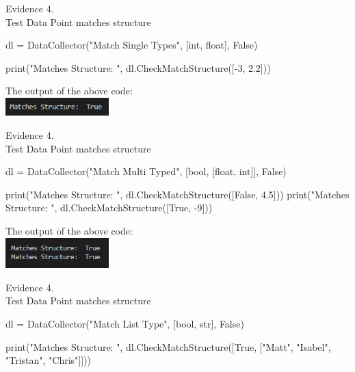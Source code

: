 \begin{center}
    {\large Evidence 4.\rn } \\ 
    \vspace{0.3cm}
    Test Data Point matches structure \\

    \begin{pythoncode}
dl = DataCollector("Match Single Types", [int, float], False)

print("Matches Structure: ", dl.CheckMatchStructure([-3, 2.2]))
    \end{pythoncode}

    The output of the above code: \\
    \includegraphics[width=4cm]{Images/Testing/T4.3.1.PNG} \\
    \vspace{1cm}

    {\large Evidence 4.\rn } \\ 
    \vspace{0.3cm}
    Test Data Point matches structure \\

    \begin{pythoncode}
dl = DataCollector("Match Multi Typed", [bool, [float, int]], False)

print("Matches Structure: ", dl.CheckMatchStructure([False, 4.5]))
print("Matches Structure: ", dl.CheckMatchStructure([True, -9]))
    \end{pythoncode}
        
    The output of the above code: \\
    \includegraphics[width=4cm]{Images/Testing/T4.4.1.PNG} \\
    \vspace{1cm}

    {\large Evidence 4.\rn } \\ 
    \vspace{0.3cm}
    Test Data Point matches structure \\

    \begin{pythoncode}
dl = DataCollector("Match List Type", [bool, str], False)

print("Matches Structure: ", dl.CheckMatchStructure([True, ["Matt", "Isabel", "Tristan", "Chris"]]))
    \end{pythoncode}
                    

\end{center}
